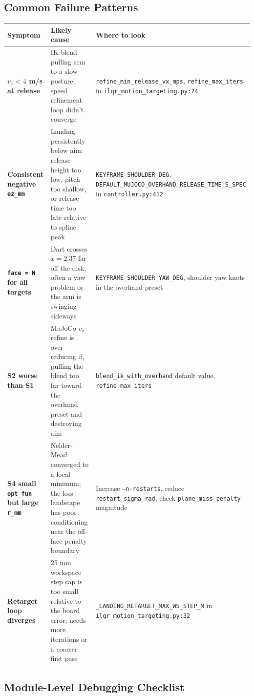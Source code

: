 \documentclass[11pt,letterpaper]{article}
\begin{document}
\subsection{Common Failure Patterns}

\begin{center}
\renewcommand{\arraystretch}{1.4}
\begin{tabular}{>{\bfseries}p{3.5cm} p{5.5cm} p{5cm}}
\toprule
Symptom & Likely cause & Where to look \\
\midrule
$v_x < 4$ m/s at release &
  IK blend pulling arm to a slow posture; speed refinement loop didn't converge &
  \texttt{refine\_min\_release\_vx\_mps}, \texttt{refine\_max\_iters} in \texttt{ilqr\_motion\_targeting.py:74} \\
\addlinespace
Consistent negative \texttt{ez\_mm} &
  Landing persistently below aim: release height too low, pitch too shallow, or release time too late relative to spline peak &
  \texttt{KEYFRAME\_SHOULDER\_DEG}, \texttt{DEFAULT\_MUJOCO\_OVERHAND\_RELEASE\_TIME\_S\_SPEC} in \texttt{controller.py:412} \\
\addlinespace
\texttt{face = N} for all targets &
  Dart crosses $x=2.37$ far off the disk; often a yaw problem or the arm is swinging sideways &
  \texttt{KEYFRAME\_SHOULDER\_YAW\_DEG}, shoulder yaw knots in the overhand preset \\
\addlinespace
S2 worse than S1 &
  MuJoCo $v_x$ refine is over-reducing $\beta$, pulling the blend too far toward the overhand preset and destroying aim &
  \texttt{blend\_ik\_with\_overhand} default value, \texttt{refine\_max\_iters} \\
\addlinespace
S4 small \texttt{opt\_fun} but large \texttt{r\_mm} &
  Nelder-Mead converged to a local minimum; the loss landscape has poor conditioning near the off-face penalty boundary &
  Increase \texttt{--n-restarts}, reduce \texttt{restart\_sigma\_rad}, check \texttt{plane\_miss\_penalty} magnitude \\
\addlinespace
Retarget loop diverges &
  25 mm workspace step cap is too small relative to the board error; needs more iterations or a coarser first pass &
  \texttt{\_LANDING\_RETARGET\_MAX\_WS\_STEP\_M} in \texttt{ilqr\_motion\_targeting.py:32} \\
\bottomrule
\end{tabular}
\end{center}

\subsection{Module-Level Debugging Checklist}
\end{document}
